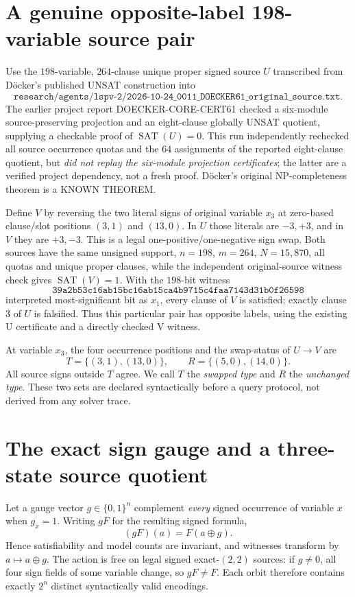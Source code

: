 \documentclass[11pt]{article}
\begin{document}
\section{A genuine opposite-label 198-variable source pair}
Use the $198$-variable, $264$-clause unique proper signed source $U$ transcribed from D\"ocker's published UNSAT construction into
\[
\texttt{research/agents/lspv-2/2026-10-24\_0011\_DOECKER61\_original\_source.txt}.
\]
The earlier project report DOECKER-CORE-CERT61 checked a six-module source-preserving projection and an eight-clause globally UNSAT quotient, supplying a checkable proof of $\operatorname{SAT}(U)=0$. This run independently rechecked all source occurrence quotas and the $64$ assignments of the reported eight-clause quotient, but \emph{did not replay the six-module projection certificates}; the latter are a verified project dependency, not a fresh proof. D\"ocker's original NP-completeness theorem is a KNOWN THEOREM.

Define $V$ by reversing the two literal signs of original variable $x_3$ at zero-based clause/slot positions $(3,1)$ and $(13,0)$. In $U$ those literals are $-3,+3$, and in $V$ they are $+3,-3$. This is a legal one-positive/one-negative sign swap. Both sources have the same unsigned support, $n=198$, $m=264$, $N=15{,}870$, all quotas and unique proper clauses, while the independent original-source witness check gives $\operatorname{SAT}(V)=1$. With the $198$-bit witness
\[
\texttt{39a2b53c16ab15bc16ab15ca4b9715c4faa7143d31b0f26598}
\]
interpreted most-significant bit as $x_1$, every clause of $V$ is satisfied; exactly clause $3$ of $U$ is falsified. Thus this particular pair has opposite labels, using the existing U certificate and a directly checked V witness.

At variable $x_3$, the four occurrence positions and the swap-status of $U\to V$ are
\[
T=\{(3,1),(13,0)\},\qquad
R=\{(5,0),(14,0)\}.
\]
All source signs outside $T$ agree. We call $T$ the \emph{swapped type} and $R$ the \emph{unchanged type}. These two sets are declared syntactically before a query protocol, not derived from any solver trace.

\section{The exact sign gauge and a three-state source quotient}
Let a gauge vector $g\in\{0,1\}^n$ complement \emph{every} signed occurrence of variable $x$ when $g_x=1$. Writing $gF$ for the resulting signed formula,
\[
(gF)(a)=F(a\oplus g).
\]
Hence satisfiability and model counts are invariant, and witnesses transform by $a\mapsto a\oplus g$. The action is free on legal signed exact-$(2,2)$ sources: if $g\ne0$, all four sign fields of some variable change, so $gF\ne F$. Each orbit therefore contains exactly $2^n$ distinct syntactically valid encodings.
\end{document}
